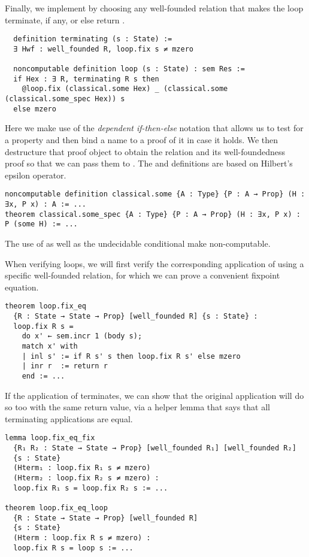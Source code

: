 Finally, we implement  by choosing any well-founded relation  that makes
the loop terminate, if any, or else return .

\begin{verbatim}
  definition terminating (s : State) :=
  ∃ Hwf : well_founded R, loop.fix s ≠ mzero

  noncomputable definition loop (s : State) : sem Res :=
  if Hex : ∃ R, terminating R s then
    @loop.fix (classical.some Hex) _ (classical.some (classical.some_spec Hex)) s
  else mzero
\end{verbatim}

Here we make use of the \emph{dependent if-then-else} notation that allows us to
test for a property and then bind a name to a proof of it in case it holds. We
then destructure that proof object to obtain the relation and its
well-foundedness proof so that we can pass them to . The
 and  definitions are based on
Hilbert's epsilon operator.

\begin{verbatim}
noncomputable definition classical.some {A : Type} {P : A → Prop} (H : ∃x, P x) : A := ...
theorem classical.some_spec {A : Type} {P : A → Prop} (H : ∃x, P x) : P (some H) := ...
\end{verbatim}

The use of  as well as the undecidable conditional
 make  non-computable.

When verifying loops, we will first verify the corresponding application of
 using a specific well-founded relation, for which we can prove a
convenient fixpoint equation.

\begin{verbatim}
theorem loop.fix_eq
  {R : State → State → Prop} [well_founded R] {s : State} :
  loop.fix R s =
    do x' ← sem.incr 1 (body s);
    match x' with
    | inl s' := if R s' s then loop.fix R s' else mzero
    | inr r  := return r
    end := ...
\end{verbatim}

If the application of  terminates, we can show that the original
application  will do so too with the same return value,
via a helper lemma that says that all terminating  applications are equal.

\begin{verbatim}
lemma loop.fix_eq_fix
  {R₁ R₂ : State → State → Prop} [well_founded R₁] [well_founded R₂]
  {s : State}
  (Hterm₁ : loop.fix R₁ s ≠ mzero)
  (Hterm₂ : loop.fix R₂ s ≠ mzero) :
  loop.fix R₁ s = loop.fix R₂ s := ...

theorem loop.fix_eq_loop
  {R : State → State → Prop} [well_founded R]
  {s : State}
  (Hterm : loop.fix R s ≠ mzero) :
  loop.fix R s = loop s := ...
\end{verbatim}

